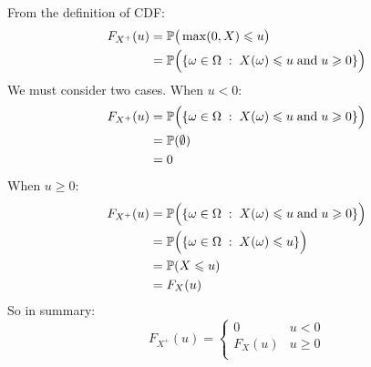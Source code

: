 \medskip\noindent
From the definition of CDF:
\begin{align*}
    F_{X^+}(u) &=  \P\big(\max(0, X)\leq u\big)\\
    &= \P\Big(\{\omega\in \Omega \;:\; X(\omega)\leq u\;\text{and}\; u\geq 0\}\Big)
\end{align*}
We must consider two cases. When $u < 0$:
\begin{align*}
    F_{X^+}(u) &= \P\Big(\{\omega\in \Omega \;:\; X(\omega)\leq u\;\text{and}\; u\geq 0\}\Big) \\
    &= \P(\emptyset) \\
    &= 0
\end{align*}
When $u\geq 0$:
\begin{align*}
    F_{X^+}(u) &= \P\Big(\{\omega\in \Omega \;:\; X(\omega)\leq u\;\text{and}\; u\geq 0\}\Big) \\
    &= \P\Big(\{\omega\in \Omega \;:\; X(\omega)\leq u\}\Big)  \\
    &= \P(X\leq u) \\
    &= F_X(u)
\end{align*}
So in summary:
$$
F_{X^+}(u) =
\left\{
    \begin{matrix}
        0 & u<0 \\
        F_X(u) & u\geq0 \\
    \end{matrix}
\right.
$$

